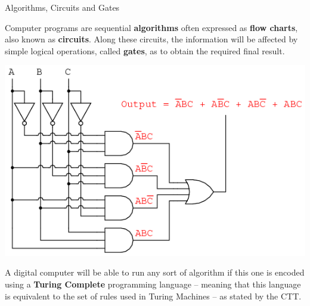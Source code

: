\documentclass[9pt, handout, aspectratio=169]{beamer}	%
\begin{document}
	\begin{frame}{Algorithms, Circuits and Gates}

		Computer programs are sequential \textbf{algorithms} often expressed as \textbf{flow charts}, also known as \textbf{circuits}. Along these circuits, the information will be affected by simple logical operations, called \textbf{gates}, as to obtain the required final result.

		\begin{center}
		\includegraphics[width=.34\paperwidth]{Figures/Digital_Gates}
		\end{center}

		\pause

		\vspace{4pt}
		A digital computer will be able to run any sort of algorithm if this one is encoded using a \textbf{Turing Complete} programming language -- meaning that this language is equivalent to the set of rules used in Turing Machines -- as stated by the CTT.

	\end{frame}


\end{document}

